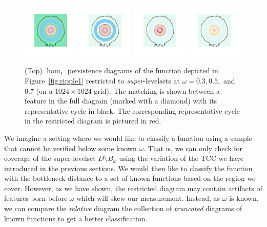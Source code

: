 \begin{figure}[htbp]
  \includegraphics[trim=500 500 500 500, clip, width=0.24\textwidth]{scripts/figures/matching2/surf_top-1.png}
  \includegraphics[trim=500 500 500 500, clip, width=0.24\textwidth]{scripts/figures/matching2/surf_top-1_0.png}
  \includegraphics[trim=500 500 500 500, clip, width=0.24\textwidth]{scripts/figures/matching2/surf_top-1_1.png}
  \includegraphics[trim=500 500 500 500, clip, width=0.24\textwidth]{scripts/figures/matching2/surf_top-1_2.png}
  \caption{(Top) $\hom_1$ persistence diagrams of the function depicted in Figure~\ref{fig:ripple1} restricted to \emph{super}-levelsets at $\omega = 0.3, 0.5,$ and $0.7$ (on a $1024\times 1024$ grid).
  The matching is shown between a feature in the full diagram (marked with a diamond) with its representative cycle in black.
  The corresponding representative cycle in the restricted diagram is pictured in red.}
\end{figure}

We imagine a setting where we would like to classify a function using a sample that cannot be verified below some known $\omega$.
That is, we can only check for coverage of the super-levelset $D\setminus B_\omega$ using the variation of the TCC we have introduced in the previous sections.
We would then like to classify the function with the bottleneck distance to a set of known functions based on the region we cover.
However, as we have shown, the restricted diagram may contain artifacts of features born before $\omega$ which will skew our measurement.
Instead, as $\omega$ is known, we can compare the \emph{relative} diagram the collection of \emph{truncated} diagrams of known functions to get a better classification.


